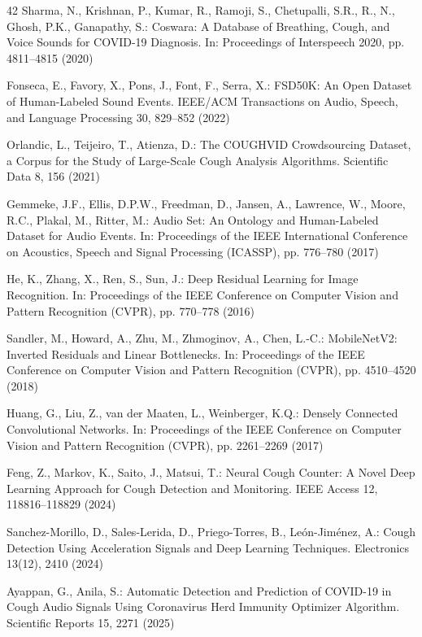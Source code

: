 \begin{thebibliography}{42}
Sharma, N., Krishnan, P., Kumar, R., Ramoji, S., Chetupalli, S.R., R., N., Ghosh, P.K., Ganapathy, S.: Coswara: A Database of Breathing, Cough, and Voice Sounds for COVID-19 Diagnosis. In: Proceedings of Interspeech 2020, pp. 4811–4815 (2020)

Fonseca, E., Favory, X., Pons, J., Font, F., Serra, X.: FSD50K: An Open Dataset of Human-Labeled Sound Events. IEEE/ACM Transactions on Audio, Speech, and Language Processing 30, 829–852 (2022)

Orlandic, L., Teijeiro, T., Atienza, D.: The COUGHVID Crowdsourcing Dataset, a Corpus for the Study of Large-Scale Cough Analysis Algorithms. Scientific Data 8, 156 (2021)

Gemmeke, J.F., Ellis, D.P.W., Freedman, D., Jansen, A., Lawrence, W., Moore, R.C., Plakal, M., Ritter, M.: Audio Set: An Ontology and Human-Labeled Dataset for Audio Events. In: Proceedings of the IEEE International Conference on Acoustics, Speech and Signal Processing (ICASSP), pp. 776–780 (2017)

He, K., Zhang, X., Ren, S., Sun, J.: Deep Residual Learning for Image Recognition. In: Proceedings of the IEEE Conference on Computer Vision and Pattern Recognition (CVPR), pp. 770–778 (2016)

Sandler, M., Howard, A., Zhu, M., Zhmoginov, A., Chen, L.-C.: MobileNetV2: Inverted Residuals and Linear Bottlenecks. In: Proceedings of the IEEE Conference on Computer Vision and Pattern Recognition (CVPR), pp. 4510–4520 (2018)

Huang, G., Liu, Z., van der Maaten, L., Weinberger, K.Q.: Densely Connected Convolutional Networks. In: Proceedings of the IEEE Conference on Computer Vision and Pattern Recognition (CVPR), pp. 2261–2269 (2017)

Feng, Z., Markov, K., Saito, J., Matsui, T.: Neural Cough Counter: A Novel Deep Learning Approach for Cough Detection and Monitoring. IEEE Access 12, 118816–118829 (2024)

Sanchez-Morillo, D., Sales-Lerida, D., Priego-Torres, B., Le{\'o}n-Jim{\'e}nez, A.: Cough Detection Using Acceleration Signals and Deep Learning Techniques. Electronics 13(12), 2410 (2024)

Ayappan, G., Anila, S.: Automatic Detection and Prediction of COVID-19 in Cough Audio Signals Using Coronavirus Herd Immunity Optimizer Algorithm. Scientific Reports 15, 2271 (2025)


\end{thebibliography}
